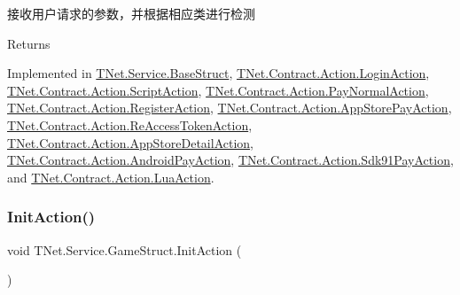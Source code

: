 接收用户请求的参数，并根据相应类进行检测 

\begin{DoxyReturn}{Returns}

\end{DoxyReturn}


Implemented in \mbox{\hyperlink{class_t_net_1_1_service_1_1_base_struct_a21e7b48b27540f2b155cd9aa0eb7fb10}{T\+Net.\+Service.\+Base\+Struct}}, \mbox{\hyperlink{class_t_net_1_1_contract_1_1_action_1_1_login_action_af7e51da954d6f20e1663c128fefe82b4}{T\+Net.\+Contract.\+Action.\+Login\+Action}}, \mbox{\hyperlink{class_t_net_1_1_contract_1_1_action_1_1_script_action_a62f8da5926744674d545c2cb75d34ba7}{T\+Net.\+Contract.\+Action.\+Script\+Action}}, \mbox{\hyperlink{class_t_net_1_1_contract_1_1_action_1_1_pay_normal_action_a08e96de1d636184b07eefe68660cb0c6}{T\+Net.\+Contract.\+Action.\+Pay\+Normal\+Action}}, \mbox{\hyperlink{class_t_net_1_1_contract_1_1_action_1_1_register_action_a54a3217dcd82c930565220bbffb44165}{T\+Net.\+Contract.\+Action.\+Register\+Action}}, \mbox{\hyperlink{class_t_net_1_1_contract_1_1_action_1_1_app_store_pay_action_aec7e467d4f96711435b3be29bb0ecdce}{T\+Net.\+Contract.\+Action.\+App\+Store\+Pay\+Action}}, \mbox{\hyperlink{class_t_net_1_1_contract_1_1_action_1_1_re_access_token_action_a7dd58986375658c072e563479d8ae29a}{T\+Net.\+Contract.\+Action.\+Re\+Access\+Token\+Action}}, \mbox{\hyperlink{class_t_net_1_1_contract_1_1_action_1_1_app_store_detail_action_ab8bc090e0a3f36cf0e90a693e12d183a}{T\+Net.\+Contract.\+Action.\+App\+Store\+Detail\+Action}}, \mbox{\hyperlink{class_t_net_1_1_contract_1_1_action_1_1_android_pay_action_a3d23fbaeea52cabdb937d5582b98829a}{T\+Net.\+Contract.\+Action.\+Android\+Pay\+Action}}, \mbox{\hyperlink{class_t_net_1_1_contract_1_1_action_1_1_sdk91_pay_action_a9b4fe6d3246d487a71ec194e120dfc2c}{T\+Net.\+Contract.\+Action.\+Sdk91\+Pay\+Action}}, and \mbox{\hyperlink{class_t_net_1_1_contract_1_1_action_1_1_lua_action_aa240dc37a9c5ebcaea3ef54ade197086}{T\+Net.\+Contract.\+Action.\+Lua\+Action}}.

\mbox{\label{class_t_net_1_1_service_1_1_game_struct_af71c98eeb85755b370345f098b69c53f}} 
\subsubsection{\texorpdfstring{Init\+Action()}{InitAction()}}
{\footnotesize\ttfamily void T\+Net.\+Service.\+Game\+Struct.\+Init\+Action (\begin{DoxyParamCaption}{ }\end{DoxyParamCaption})\hspace{0.3cm}{\ttfamily [protected]}}



